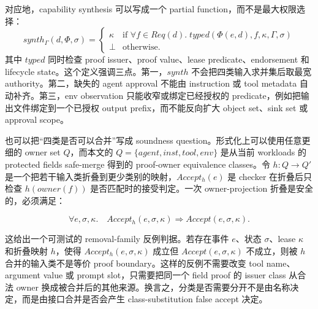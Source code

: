 \documentclass[UTF8,a4paper,11pt]{ctexart}
\begin{document}
对应地，capability synthesis 可以写成一个 partial function，而不是最大权限选择：
\[
synth_\Gamma(d,\Phi,\sigma)=
\begin{cases}
\kappa & \text{if } \forall f\in Req(d).\; typed(\Phi(e,d),f,\kappa,\Gamma,\sigma)\\
\bot & \text{otherwise.}
\end{cases}
\]
其中 \(typed\) 同时检查 proof issuer、proof value、lease predicate、endorsement 和 lifecycle state。这个定义强调三点。第一，\(synth\) 不会把四类输入求并集后取最宽 authority。第二，缺失的 agent approval 不能由 instruction 或 tool metadata 自动补齐。第三，env observation 只能收窄或绑定已经授权的 predicate，例如把输出文件绑定到一个已授权 output prefix，而不能反向扩大 object set、sink set 或 approval scope。

也可以把“四类是否可以合并”写成 soundness question。形式化上可以使用任意更细的 owner set \(Q\)，而本文的 \(Q=\{agent,inst,tool,env\}\) 是从当前 workloads 的 protected fields safe-merge 得到的 proof-owner equivalence classes。令 \(h:Q\rightarrow Q'\) 是一个把若干输入类折叠到更少类别的映射，\(Accept_h(e)\) 是 checker 在折叠后只检查 \(h(owner(f))\) 是否匹配时的接受判定。一次 owner-projection 折叠是安全的，必须满足：

\[
\forall e,\sigma,\kappa.\quad Accept_h(e,\sigma,\kappa) \Rightarrow Accept(e,\sigma,\kappa).
\]

这给出一个可测试的 removal-family 反例判据。若存在事件 \(e\)、状态 \(\sigma\)、lease \(\kappa\) 和折叠映射 \(h\)，使得 \(Accept_h(e,\sigma,\kappa)\) 成立但 \(Accept(e,\sigma,\kappa)\) 不成立，则被 \(h\) 合并的输入类不是等价 proof boundary。这样的反例不需要改变 tool name、argument value 或 prompt slot，只需要把同一个 field proof 的 issuer class 从合法 owner 换成被合并后的其他来源。换言之，分类是否需要分开不是由名称决定，而是由接口合并是否会产生 class-substitution false accept 决定。
\end{document}
